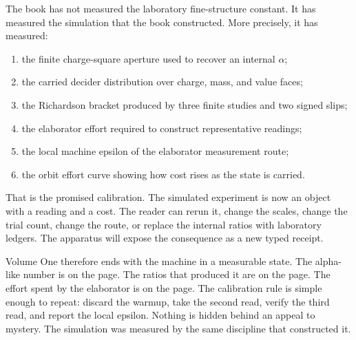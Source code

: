 The book has not measured the laboratory fine-structure constant. It has measured the simulation that the book
constructed. More precisely, it has measured:
\begin{enumerate}
\item the finite charge-square aperture used to recover an internal \(\alpha\);
\item the carried decider distribution over charge, mass, and value faces;
\item the Richardson bracket produced by three finite studies and two signed slips;
\item the elaborator effort required to construct representative readings;
\item the local machine epsilon of the elaborator measurement route;
\item the orbit effort curve showing how cost rises as the state is carried.
\end{enumerate}
That is the promised calibration. The simulated experiment is now an object with a reading and a cost. The reader
can rerun it, change the scales, change the trial count, change the route, or replace the internal ratios with
laboratory ledgers. The apparatus will expose the consequence as a new typed receipt.

Volume One therefore ends with the machine in a measurable state. The alpha-like number is on the page. The
ratios that produced it are on the page. The effort spent by the elaborator is on the page. The calibration rule
is simple enough to repeat: discard the warmup, take the second read, verify the third read, and report the local
epsilon. Nothing is hidden behind an appeal to mystery. The simulation was measured by the same discipline that
constructed it.
